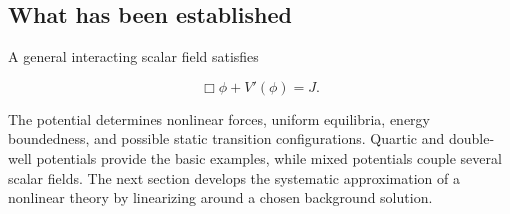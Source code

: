 \subsection{What has been established}

A general interacting scalar field satisfies

\[
\Box\phi+V'(\phi)=J.
\]

The potential determines nonlinear forces, uniform equilibria, energy boundedness, and possible static transition configurations. Quartic and double-well potentials provide the basic examples, while mixed potentials couple several scalar fields. The next section develops the systematic approximation of a nonlinear theory by linearizing around a chosen background solution.